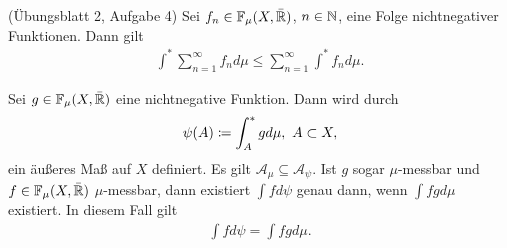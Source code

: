 \documentclass[a4paper,twoside,DIV15,BCOR12mm]{scrbook}
\newcommand{\A}{\mathcal A}
\begin{document}
\begin{lemma}
\label{lem1.18}
(Übungsblatt 2, Aufgabe 4) Sei $f_n\in\mathbb F_\mu(X,\bar{\mathbb{R}})$, $n\in\mathbb{N}$, eine Folge nichtnegativer Funktionen. Dann gilt
\begin{align*}
\int^* \sum_{n=1}^\infty {f_n} d\mu \le \sum_{n=1}^\infty \int^* f_n d\mu.
\end{align*}
\end{lemma}

\begin{satz}
\label{satz1.19}
Sei $g\in \mathbb F_\mu(X,\bar{\mathbb{R}})$ eine nichtnegative Funktion. Dann wird  durch
\begin{align*}
\psi(A) \da \int_A^* gd\mu, \  A\subset X,
\end{align*}
 ein äußeres Maß auf $X$ definiert. Es gilt $\A_\mu \subseteq \A_\psi$. Ist $g$ sogar $\mu$-messbar und $f\in\mathbb F_\mu(X,\bar{\mathbb{R}})$ $\mu$-messbar, dann existiert $\int fd\psi$ genau dann, wenn $\int fgd\mu$ existiert. In diesem Fall gilt
\begin{align*}
\int fd\psi = \int fg d\mu.
\end{align*}
\end{satz}
\end{document}
